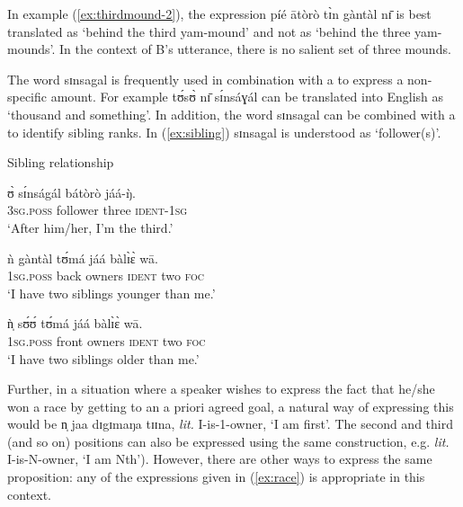 \begin{exe}
\begin{exe}
\begin{exe}
\begin{exe}
\begin{exe}
\begin{exe}
\begin{exe}
\begin{exe}
\begin{exe}
\begin{exe}
\z
\z


In example (\ref{ex:thirdmound-2}),  the expression {\sls píé ātòrò tɪ̀n  gàntàl  nɪ̄} is best translated as `behind the third yam-mound' and not as `behind the three yam-mounds'. In the context of B's utterance, there is no  salient set of three mounds.  

The word  {\sls sɪnsagal} is frequently  used in combination with a  to express a non-specific amount. For example  {\sls tʊ́sʊ̀ nɪ̄ sɪ́nsáɣál}  can be translated into English as  `thousand and something'. In addition,  the word {\sls sɪnsagal} can be combined with a  to identify sibling ranks. In (\ref{ex:sibling})  {\sls sɪnsagal} is understood as `follower(s)'.  


\begin{exe}
\ex\label{ex:sibling}{\rm Sibling relationship}
\begin{xlist}

\ex\label{ex:sibling-a}
\gll ʊ̀ sɪ́nságál bátòrò jáá-ŋ̀.\\
   \textsc{3sg.poss} {follower} {three} \textsc{ident-1sg}\\
 \glt  `After him/her, I'm the third.'

\ex\label{ex:sibling-b}
\gll ǹ gàntàl tʊ́má jáá bàlɪ̀ɛ̀ wā.\\
 \textsc{1sg.poss} {back} {owners} \textsc{ident}  {two}  \textsc{foc}\\
\glt   `I have two siblings younger than me.' 


\ex\label{ex:sibling-c}
\gll ǹ̩ sʊ́ʊ́ tʊ́má jáá bàlɪ̀ɛ̀ wā.\\
   \textsc{1sg.poss} {front} {owners} \textsc{ident}  {two}  \textsc{foc}\\
 \glt  `I have two siblings older than me.'
\end{xlist}
\end{exe}



Further, in a situation where a speaker wishes to express the fact that he/she won a race by getting to an a priori agreed goal, a natural way of expressing this would be  {\sls n̩  jaa dɪgɪmaŋa tɪɪna},  {\it lit.} I-is-1-owner,  `I am first'. The second and third (and so on) positions can also be expressed using the same construction, e.g. {\it lit.} I-is-N-owner, `I am Nth'). However,  there are other ways to express the same proposition: any of the expressions given in (\ref{ex:race}) is appropriate in this context.


\end{exe}
\end{exe}
\end{exe}
\end{exe}
\end{exe}
\end{exe}
\end{exe}
\end{exe}
\end{exe}
\end{exe}
